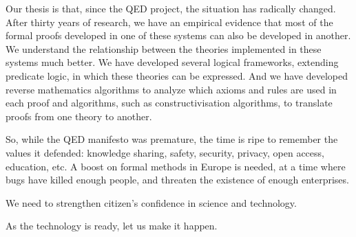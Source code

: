 Our thesis is that, since the QED project, the situation has radically
changed. After thirty years of research, we have an empirical evidence
that most of the formal proofs developed in one of these systems can
also be developed in another. We understand the relationship between
the theories implemented in these systems much better. We have
developed several logical frameworks, extending predicate logic, in
which these theories can be expressed. And we have developed reverse
mathematics algorithms to analyze which axioms and rules are used in
each proof and algorithms, such as constructivisation algorithms, to
translate proofs from one theory to another.

So, while the QED manifesto was premature, the time is ripe to
remember the values it defended: knowledge sharing, safety, security,
privacy, open access, education, etc. A boost on formal methods in
Europe is needed, at a time where bugs have killed enough people, and
threaten the existence of enough enterprises.

We need to strengthen citizen's confidence in science and technology.

As the technology is ready, let us make it happen.

